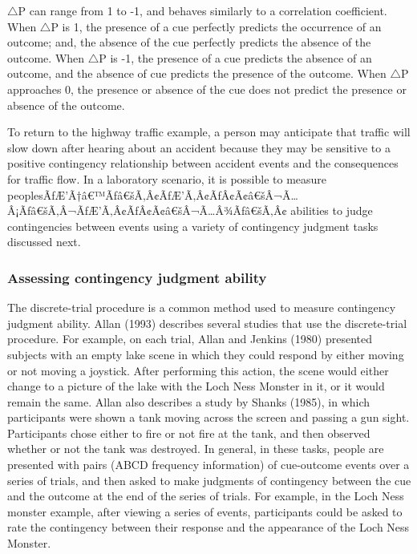 \documentclass[
  english,
  man,floatsintext]{apa6}
\begin{document}
\(\triangle\)P can range from 1 to -1, and behaves similarly to a correlation coefficient. When \(\triangle\)P is 1, the presence of a cue perfectly predicts the occurrence of an outcome; and, the absence of the cue perfectly predicts the absence of the outcome. When \(\triangle\)P is -1, the presence of a cue predicts the absence of an outcome, and the absence of cue predicts the presence of the outcome. When \(\triangle\)P approaches 0, the presence or absence of the cue does not predict the presence or absence of the outcome.

To return to the highway traffic example, a person may anticipate that traffic will slow down after hearing about an accident because they may be sensitive to a positive contingency relationship between accident events and the consequences for traffic flow. In a laboratory scenario, it is possible to measure peoplesÃƒÆ'Ã†â€™Ãƒâ€šÃ‚Â¢ÃƒÆ'Ã‚Â¢ÃƒÂ¢Ã¢â€šÂ¬Ã\ldots Â¡Ãƒâ€šÃ‚Â¬ÃƒÆ'Ã‚Â¢ÃƒÂ¢Ã¢â€šÂ¬Ã\ldots Â¾Ãƒâ€šÃ‚Â¢ abilities to judge contingencies between events using a variety of contingency judgment tasks discussed next.

\hypertarget{assessing-contingency-judgment-ability}{%
\subsubsection{Assessing contingency judgment ability}\label{assessing-contingency-judgment-ability}}

The discrete-trial procedure is a common method used to measure contingency judgment ability. Allan (1993) describes several studies that use the discrete-trial procedure. For example, on each trial, Allan and Jenkins (1980) presented subjects with an empty lake scene in which they could respond by either moving or not moving a joystick. After performing this action, the scene would either change to a picture of the lake with the Loch Ness Monster in it, or it would remain the same. Allan also describes a study by Shanks (1985), in which participants were shown a tank moving across the screen and passing a gun sight. Participants chose either to fire or not fire at the tank, and then observed whether or not the tank was destroyed. In general, in these tasks, people are presented with pairs (ABCD frequency information) of cue-outcome events over a series of trials, and then asked to make judgments of contingency between the cue and the outcome at the end of the series of trials. For example, in the Loch Ness monster example, after viewing a series of events, participants could be asked to rate the contingency between their response and the appearance of the Loch Ness Monster.
\end{document}
